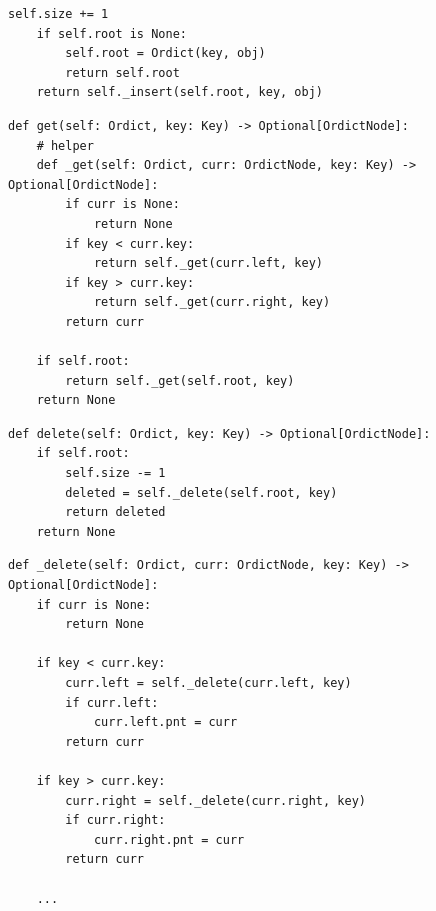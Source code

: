 \documentclass[mathserif, handout]{beamer}
\begin{document}
\begin{frame}[fragile]
\begin{thmboxbot}
\begin{lstlisting}[style=mypython, firstnumber=last]
    self.size += 1
    if self.root is None:
        self.root = Ordict(key, obj)
        return self.root
    return self._insert(self.root, key, obj)
\end{lstlisting}
\end{thmboxbot}
\end{frame}

\begin{frame}[fragile]
\begin{proofbox}
\begin{lstlisting}[style=mypython]    
def get(self: Ordict, key: Key) -> Optional[OrdictNode]:
    # helper
    def _get(self: Ordict, curr: OrdictNode, key: Key) -> Optional[OrdictNode]:
        if curr is None:
            return None
        if key < curr.key:
            return self._get(curr.left, key)
        if key > curr.key:
            return self._get(curr.right, key)
        return curr
    
    if self.root:
        return self._get(self.root, key)
    return None
\end{lstlisting}
\end{proofbox}
\end{frame}

\begin{frame}[fragile]
\begin{thmbox}
\begin{lstlisting}[style=mypython]    
def delete(self: Ordict, key: Key) -> Optional[OrdictNode]:
    if self.root:
        self.size -= 1
        deleted = self._delete(self.root, key)
        return deleted
    return None
\end{lstlisting}
\end{thmbox}
\end{frame}

\begin{frame}[fragile]
\vspace{-5mm}
\begin{thmbox}
\begin{lstlisting}[style=mypython]    
def _delete(self: Ordict, curr: OrdictNode, key: Key) -> Optional[OrdictNode]:
    if curr is None:
        return None

    if key < curr.key:
        curr.left = self._delete(curr.left, key)
        if curr.left:
            curr.left.pnt = curr
        return curr

    if key > curr.key:
        curr.right = self._delete(curr.right, key)
        if curr.right:
            curr.right.pnt = curr
        return curr
        
    ...
\end{lstlisting}
\end{thmbox}
\end{frame}
\end{document}
